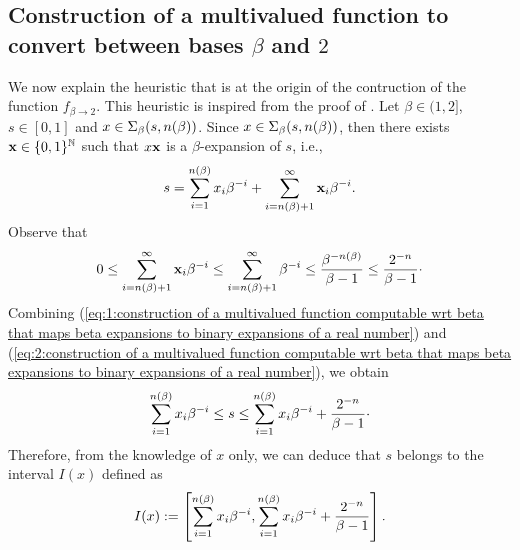 \subsection{\texorpdfstring{Construction of a multivalued function to convert between bases $\beta$ and $2$}{}}
We now explain the heuristic that is at the origin of the contruction of the function $f_{\beta \to 2}$. This heuristic is inspired from the proof of \cite[Theorem 3]{staiger2002kolmogorov}. Let $\beta \in (1,2]$, $s \in [0,1]$ and $x \in \Sigma_\beta(s,n(\beta))$. Since $x \in \Sigma_\beta(s,n(\beta))$, then there exists ${\bf x} \in \{0,1\}^{\mathbb{N}}$ such that $x{\bf x}$ is a $\beta$-expansion of $s$, i.e.,
\begin{equation}\label{eq:1:construction of a multivalued function computable wrt beta that maps beta expansions to binary expansions of a real number}
    s = \sum_{i=1}^{n(\beta)} x_i \beta^{-i} + \sum_{i=n(\beta)+1}^{\infty} {\bf x}_i \beta^{-i}.
\end{equation}
Observe that 
\begin{equation}\label{eq:2:construction of a multivalued function computable wrt beta that maps beta expansions to binary expansions of a real number}
    0 \leq \sum_{i=n(\beta)+1}^{\infty} {\bf x}_i \beta^{-i} \leq \sum_{i=n(\beta)+1}^{\infty} \beta^{-i} \leq \frac{\beta^{-n(\beta)}}{\beta-1} \leq \frac{2^{-n}}{\beta-1}\cdot
\end{equation}
Combining (\ref{eq:1:construction of a multivalued function computable wrt beta that maps beta expansions to binary expansions of a real number}) and (\ref{eq:2:construction of a multivalued function computable wrt beta that maps beta expansions to binary expansions of a real number}), we obtain
\begin{equation}\label{eq:3:construction of a multivalued function computable wrt beta that maps beta expansions to binary expansions of a real number}
    \sum_{i=1}^{n(\beta)} x_i \beta^{-i} \leq s \leq \sum_{i=1}^{n(\beta)} x_i \beta^{-i} + \frac{2^{-n}}{\beta-1}\cdot
\end{equation}
Therefore, from the knowledge of $x$ only, we can deduce that $s$ belongs to the interval $I(x)$ defined as 
\begin{equation}\label{eq:4:construction of a multivalued function computable wrt beta that maps beta expansions to binary expansions of a real number}
    I(x) :=  \left[\sum_{i=1}^{n(\beta)} x_i \beta^{-i},  \sum_{i=1}^{n(\beta)} x_i \beta^{-i}+ \frac{2^{-n}}{\beta-1} \right].
\end{equation}
